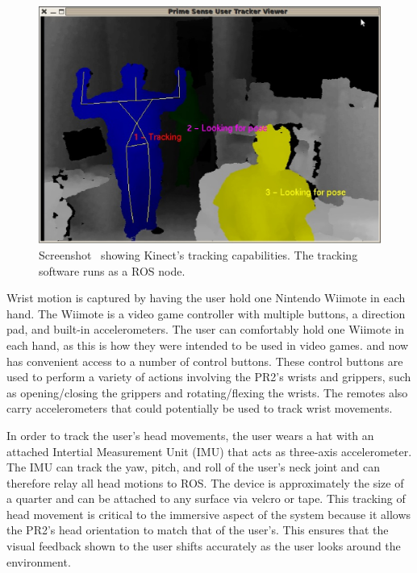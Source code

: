 \documentclass{sig-alternate}
\begin{document}
\begin{figure}[htb] 
	\begin{center}
		\includegraphics[width=0.8\linewidth]{kinect}
	\end{center}
	\caption{Screenshot~\cite{kinect_pic} showing Kinect's tracking capabilities. The tracking software runs as a ROS node.}
	\label{fig:kinect_screenshot}
\end{figure}

\indent Wrist motion is captured by having the user hold one Nintendo Wiimote 
in each hand. The Wiimote is a video game controller with 
multiple buttons, a direction pad, and built-in accelerometers. 
The user can comfortably hold one Wiimote in each hand,
as this is how they were intended to be used in video games. and now has
convenient access to a number of
control buttons. These control buttons are used to perform a variety of actions
involving the PR2's wrists and grippers, such as opening/closing the grippers and
rotating/flexing the wrists. The remotes also carry accelerometers that could potentially be used
to track wrist movements. 

\indent In order to track the user's head movements, the user wears a hat
with an attached Intertial Measurement Unit (IMU) that acts as three-axis accelerometer. The IMU can track the yaw, pitch, and roll of the user's neck joint and can therefore relay all head motions to ROS. The device is
approximately the size of a quarter and can be attached to any surface via velcro or tape. This tracking of head movement is critical to the immersive aspect of the system
because it allows the PR2's head orientation to match that of the user's.
This ensures that the visual feedback shown to the user shifts accurately
as the user looks around the environment.
\end{document}
